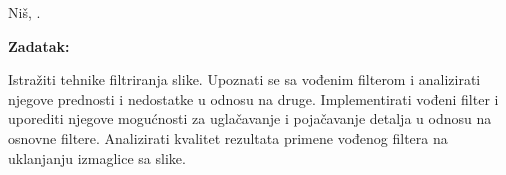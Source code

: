 \documentclass[a4paper,12pt,titlepage]{article}
\begin{document}
\begin{titlepage}
    \vspace{1cm}
   
    
    
        
   
  
    
    
     \begin{center}
        Niš, \the\year.
    \end{center}
\end{titlepage}

\vspace{2cm}

   \noindent
    \textbf{Zadatak:}
    
   \vspace{0.2cm}

 \noindent
Istražiti tehnike filtriranja slike. Upoznati se sa vođenim filterom i analizirati njegove prednosti i nedostatke u odnosu na druge. Implementirati vođeni filter i uporediti njegove mogućnosti za uglačavanje i pojačavanje detalja u odnosu na osnovne filtere. Analizirati kvalitet rezultata primene vođenog filtera na uklanjanju izmaglice sa slike. 
  
\end{document}
